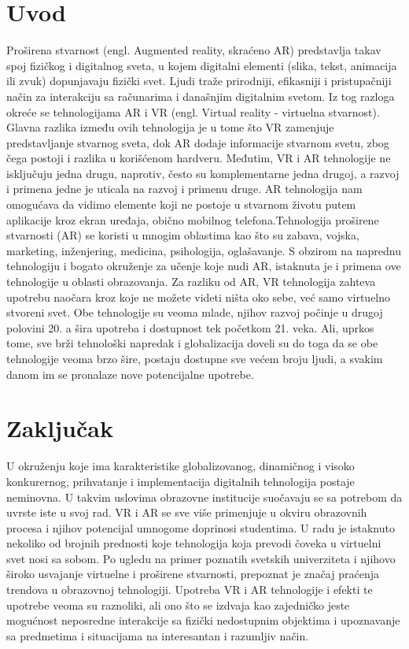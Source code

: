 \documentclass[a4paper]{article}
\begin{document}
	\section{Uvod}
	\label{sec:Uvod}
	Proširena stvarnost (engl. Augmented reality, skraćeno AR) predstavlja takav spoj fizičkog i digitalnog sveta, u kojem digitalni elementi (slika, tekst, animacija ili zvuk) dopunjavaju fizički svet. Ljudi traže prirodniji, efikasniji i pristupačniji način za interakciju sa računarima i današnjim digitalnim svetom. Iz tog razloga okreće se tehnologijama AR i VR (engl. Virtual reality - virtuelna stvarnost). Glavna razlika između ovih tehnologija je u tome što VR zamenjuje predstavljanje stvarnog sveta, dok AR dodaje informacije stvarnom svetu, zbog čega postoji i razlika u korišćenom hardveru. Međutim, VR i AR tehnologije ne isključuju jedna drugu, naprotiv, često su komplementarne jedna drugoj, a razvoj i primena jedne je uticala na razvoj i primenu druge. AR tehnologija nam omogućava da vidimo elemente koji ne postoje u stvarnom životu putem aplikacije kroz ekran uređaja, obično mobilnog telefona.Tehnologija proširene stvarnosti (AR) se koristi u mnogim oblastima kao što su zabava, vojska, marketing, inženjering, medicina, psihologija, oglašavanje. S obzirom na naprednu tehnologiju i bogato okruženje za učenje koje nudi AR, istaknuta je i primena ove tehnologije u oblasti obrazovanja. Za razliku od AR, VR tehnologija zahteva upotrebu naočara kroz koje ne možete videti ništa oko sebe, već samo virtuelno stvoreni svet. Obe tehnologije su veoma mlade, njihov razvoj počinje u drugoj polovini 20. a šira upotreba i dostupnost tek početkom 21. veka. Ali, uprkos tome, sve brži tehnološki napredak i globalizacija doveli su do toga da se obe tehnologije veoma brzo šire, postaju dostupne sve većem broju ljudi, a svakim danom im se pronalaze nove potencijalne upotrebe.
	
	\section{Zaključak}
	\label{sec:Zaključak}
	U okruženju koje ima karakteristike globalizovanog, dinamičnog i visoko  konkurernog, prihvatanje i implementacija digitalnih tehnologija postaje neminovna. U takvim uslovima obrazovne institucije suočavaju se sa potrebom da uvrste iste u svoj rad. VR i AR se sve više primenjuje u okviru obrazovnih procesa i njihov potencijal umnogome doprinosi studentima. U radu je istaknuto nekoliko od brojnih prednosti koje tehnologija koja prevodi čoveka u virtuelni svet nosi sa sobom. Po ugledu na primer poznatih svetskih univerziteta i njihovo široko usvajanje virtuelne i proširene stvarnosti, prepoznat je značaj praćenja trendova u obrazovnoj tehnologiji. Upotreba VR i AR tehnologije i efekti te upotrebe veoma su raznoliki, ali ono što se izdvaja kao zajedničko jeste mogućnost neposredne interakcije sa fizički nedostupnim objektima i upoznavanje sa predmetima i situacijama na interesantan i razumljiv način.
\end{document}
